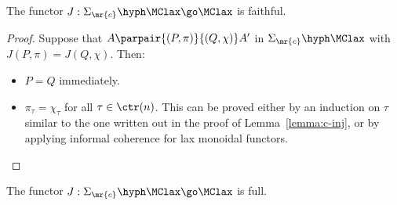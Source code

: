 \begin{lemma}
The functor $J: \Sigma_\mr{c}\hyph\MClax \go \MClax$ is faithful.
\end{lemma}

\begin{proof}
Suppose that $A \parpair{(P,\pi)}{(Q,\chi)} A'$ in
$\Sigma_\mr{c}\hyph\MClax$ with $J(P,\pi) = J(Q,\chi)$.  Then:
%
\begin{itemize}
\item $P=Q$ immediately.
\item $\pi_\tau = \chi_\tau$ for all $\tau\in\ctr(n)$.  This can be proved
either by an induction on $\tau$ similar to the one written out in the
proof of Lemma~\ref{lemma:c-inj}, or by applying informal coherence for lax
monoidal functors.
\done
\end{itemize}
\end{proof}

\begin{lemma}
The functor $J: \Sigma_\mr{c}\hyph\MClax \go \MClax$ is full.
\end{lemma}

